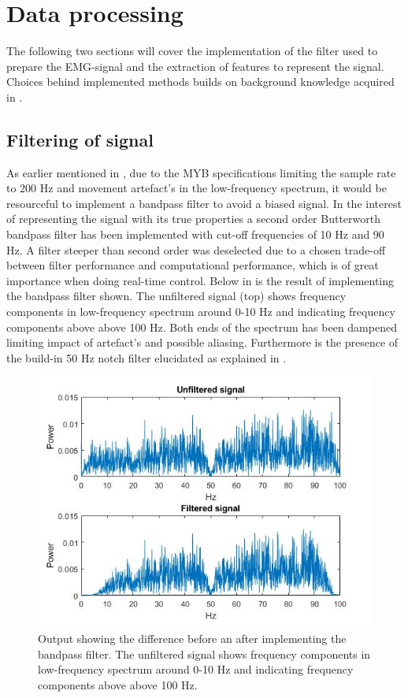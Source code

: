 

\section{Data processing}

The following two sections will cover the implementation of the filter used to prepare the EMG-signal and the extraction of features to represent the signal. Choices behind implemented methods builds on background knowledge acquired in . 


\subsection{Filtering of signal} \label{sec:prePros} 

As earlier mentioned in , due to the MYB specifications limiting the sample rate to 200 Hz and movement artefact's in the low-frequency spectrum, it would be resourceful to implement a bandpass filter to avoid a biased signal.
In the interest of representing the signal with its true properties a second order Butterworth bandpass filter has been implemented with cut-off frequencies of 10 Hz and 90 Hz. A filter steeper than second order was deselected due to a chosen trade-off between filter performance and computational performance, which is of great importance when doing real-time control. Below in  is the result of implementing the bandpass filter shown. The unfiltered signal (top) shows frequency components in low-frequency spectrum around 0-10 Hz and indicating frequency components above above 100 Hz. Both ends of the spectrum has been dampened limiting impact of artefact's and possible aliasing. Furthermore is the presence of the build-in 50 Hz notch filter elucidated as explained in .     


\begin{figure}[H]                 
	\includegraphics[width=.8\textwidth]{figures/pMethods/Filt}  
	\caption{Output showing the difference before an after implementing the bandpass filter. The unfiltered signal shows frequency components in low-frequency spectrum around 0-10 Hz and indicating frequency components above above 100 Hz. }
	\label{fig:filt} 
\end{figure}





